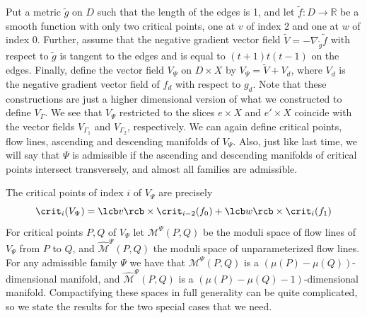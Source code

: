 Put a metric $\widetilde g$ on $D$ such that the length of the edges is 1, and let $\widetilde f : D \rightarrow \mathbb R$ be a smooth function with only two critical points, one at $v$ of index 2 and one at $w$ of index 0. Further, assume that the negative gradient vector field $\widetilde V = -\nabla_{\widetilde g} \widetilde f$ with respect to $\widetilde g$ is tangent to the edges and is equal to $(t+1)t(t-1)$ on the edges. Finally, define the vector field $V_\Psi$ on $D \times X$ by $V_\Psi = \widetilde V + V_d$, where $V_d$ is the negative gradient vector field of $f_d$ with respect to $g_d$. Note that these constructions are just a higher dimensional version of what we constructed to define $V_\Gamma$. We see that $V_\Psi$ restricted to the slices $e \times X$ and $e' \times X$ coincide with the vector fields $V_{\Gamma_1}$ and $V_{\Gamma_2}$, respectively. We can again define critical points, flow lines, ascending and descending manifolds of $V_\Psi$. Also, just like last time, we will say that $\Psi$ is admissible if the ascending and descending manifolds of critical points intersect transversely, and almost all families are admissible.

The critical points of index $i$ of $V_\Psi$ are precisely
\[ \crit_i(V_\Psi) = \lcb v \rcb \times \crit_{i-2}(f_0) + \lcb w \rcb \times \crit_i(f_1) \]
For critical points $P,Q$ of $V_\Psi$ let $\mathcal M^\Psi(P,Q)$ be the moduli space of flow lines of $V_\Psi$ from $P$ to $Q$, and $\widehat{\mathcal M}^\Psi(P,Q)$ the moduli space of unparameterized flow lines. For any admissible family $\Psi$ we have that $\mathcal M^\Psi(P,Q)$ is a $(\mu(P)-\mu(Q))$-dimensional manifold, and $\widehat{\mathcal M}^\Psi(P,Q)$ is a $(\mu(P)-\mu(Q)-1)$-dimensional manifold. Compactifying these spaces in full generality can be quite complicated, so we state the results for the two special cases that we need.


